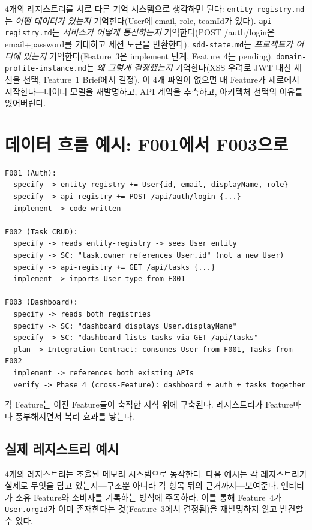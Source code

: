 \documentclass[11pt,a4paper,openright,twoside]{report}
\begin{document}
4개의 레지스트리를 서로 다른 기억 시스템으로 생각하면 된다: \texttt{entity-registry.md}는 \emph{어떤 데이터가 있는지} 기억한다(User에 email, role, teamId가 있다). \texttt{api-registry.md}는 \emph{서비스가 어떻게 통신하는지} 기억한다(POST /auth/login은 email+password를 기대하고 세션 토큰을 반환한다). \texttt{sdd-state.md}는 \emph{프로젝트가 어디에 있는지} 기억한다(Feature~3은 implement 단계, Feature~4는 pending). \texttt{domain-profile-instance.md}는 \emph{왜 그렇게 결정했는지} 기억한다(XSS 우려로 JWT 대신 세션을 선택, Feature~1 Brief에서 결정). 이 4개 파일이 없으면 매 Feature가 제로에서 시작한다---데이터 모델을 재발명하고, API 계약을 추측하고, 아키텍처 선택의 이유를 잃어버린다.

\section{데이터 흐름 예시: F001에서 F003으로}

\begin{lstlisting}[title={Cross-Feature Data Flow}]
F001 (Auth):
  specify -> entity-registry += User{id, email, displayName, role}
  specify -> api-registry += POST /api/auth/login {...}
  implement -> code written

F002 (Task CRUD):
  specify -> reads entity-registry -> sees User entity
  specify -> SC: "task.owner references User.id" (not a new User)
  specify -> api-registry += GET /api/tasks {...}
  implement -> imports User type from F001

F003 (Dashboard):
  specify -> reads both registries
  specify -> SC: "dashboard displays User.displayName"
  specify -> SC: "dashboard lists tasks via GET /api/tasks"
  plan -> Integration Contract: consumes User from F001, Tasks from F002
  implement -> references both existing APIs
  verify -> Phase 4 (cross-Feature): dashboard + auth + tasks together
\end{lstlisting}

각 Feature는 이전 Feature들이 축적한 지식 위에 구축된다. 레지스트리가 Feature마다 풍부해지면서 복리 효과를 낳는다.

\subsection{실제 레지스트리 예시}

4개의 레지스트리는 조율된 메모리 시스템으로 동작한다. 다음 예시는 각 레지스트리가 실제로 무엇을 담고 있는지---구조뿐 아니라 각 항목 뒤의 근거까지---보여준다. 엔티티가 소유 Feature와 소비자를 기록하는 방식에 주목하라. 이를 통해 Feature~4가 \texttt{User.orgId}가 이미 존재한다는 것(Feature~3에서 결정됨)을 재발명하지 않고 발견할 수 있다.
\end{document}

